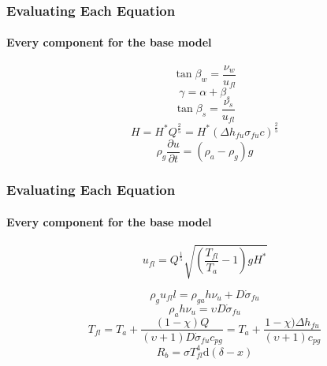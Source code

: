 \documentclass{beamer}
\begin{document}
\begin{frame}
	\frametitle{Evaluating Each Equation}
	\framesubtitle{Every component for the base model}
\begin{equation}
	\tan \beta _ w = \frac {\nu _ w} {u_{fl}} \label{beta_w}
	\end{equation}
\begin{equation}
	\gamma = \alpha + \beta _ s \label{gamma}
	\end{equation}
\begin{equation}
	\tan \beta _ s = \frac {\nu _ s} {u_{fl}} \label{tan_beta}
	\end{equation}
\begin{equation}
	H = H^{*} Q^{\frac {2}{5}} = H^{*}(\Delta h_{fu} \sigma _{fu} c) ^{\frac {2}{5}} \label{Flame height}
	\end{equation}
\begin{equation}
	\label{Vertical momentum Balbi}
	\rho _ g \frac {\partial u} {\partial t} = (\rho _a - \rho _g) g
\end{equation}

\end{frame}


	\begin{frame}
		\frametitle{Evaluating Each Equation}
	\framesubtitle{Every component for the base model}
	\begin{equation}
	\label{gas velocity}
	u_{fl} = Q ^ {\frac {1}{5}} \sqrt{(\frac {T_{fl}} {T_a} - 1) g H^{*}}
\end{equation}

\begin{equation}
	\label{mass balance balbi}
	\rho_g u_{fl}l = \rho_{ga} h \nu _u + D \dot{\sigma} _ {fu}
\end{equation}
\begin{equation}
	\rho _ a h \nu _ u = \upsilon D \dot{\sigma} _ {fu} \label{stoich ratio}
	\end{equation}
	\begin{equation}
	T_{fl} = T_a + \frac {(1 - \chi) Q}{(\upsilon + 1) D \dot{\sigma} _ {fu} c_{pg}} = T_a + \frac {1 - \chi) \Delta h _ {fu} }{(\upsilon + 1) c_{pg}} \label{flame temp balbi 2007}
	\end{equation}
	\begin{equation}
	R_b = \sigma T^{4}_{fl} \mathrm{d}(\delta - x) \label{R_b 2007}
	\end{equation}
\end{frame}
\end{document}
